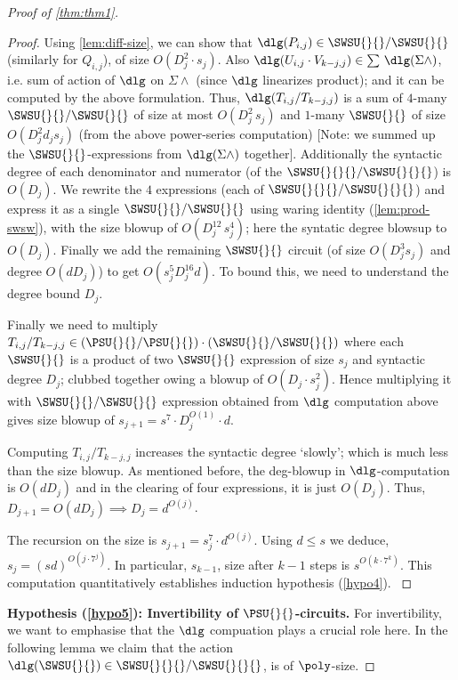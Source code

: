 \begin{proof}[Proof of \autoref{thm:thm1}]
\begin{proof}
Using \autoref{lem:diff-size}, we can show that $\dlg(P_{i,j}) \in \SWSU{}{}/\SWSU{}{}$ (similarly for $Q_{i,j}$), of size $O(D_{j}^2 \cdot s_j)$. Also $\dlg(U_{i,j} \cdot V_{k-j,j}) \in \sum \,\dlg(\Sigma \wedge)$, i.e. sum of action of $\dlg$ on $\Sigma \wedge$ (since $\dlg$ linearizes product); and it can be computed by the above formulation. 
Thus, $\dlg(T_{i,j}/T_{k-j,j})$ is a sum of $4$-many  $\SWSU{}{}/\SWSU{}{}$ of size at most $O(D_{j}^2\,s_j)$ and $1$-many $\SWSU{}{}$ of size $O(D_j^2 d_j s_j)$ (from the above power-series computation) [Note: we summed up the $\SWSU{}{}$-expressions from $\dlg(\Sigma \wedge)$ together]. Additionally the syntactic degree of each denominator and numerator (of the $\SWSU{}{}{}/\SWSU{}{}{}$) is $O(D_j)$. We rewrite the $4$ expressions (each of $\SWSU{}{}{}/\SWSU{}{}{}$) and express it as a single $\SWSU{}{}/\SWSU{}{}$ using waring identity (\autoref{lem:prod-swsw}), with the size blowup of $O(D_{j}^{12}\,s_j^{4})$; here the syntatic degree blowsup to $O(D_j)$. Finally we add the remaining $\SWSU{}{}$ circuit (of size $O(D_j^3 s_j)$ and degree $O(dD_j)$) to get $O(s_j^{5} D_{j}^{16}d)$. To bound this, we need to understand the degree bound $D_j$. 

Finally we need to multiply $T_{i,j}/T_{k-j,j} \in (\PSU{}{}/\PSU{}{}) \cdot (\SWSU{}{}/\SWSU{}{})$ where each $\SWSU{}{}$ is a product of two $\SWSU{}{}$ expression of size $s_j$ and syntactic degree $D_j$; clubbed together owing a blowup of $O(D_j \cdot s_j^2)$. Hence multiplying it with $\SWSU{}{} / \SWSU{}{}$ expression obtained from $\dlg$ computation above gives size blowup of $s_{j+1} = s^7 \cdot D_j^{O(1)} \cdot d$.

Computing $T_{i,j}/T_{k-j,j}$ increases the syntactic degree `slowly'; which is much less than the size blowup.
As mentioned before, the deg-blowup in $\dlg$-computation is $O(dD_j)$ and in the clearing of four expressions, it is just $O(D_j)$. Thus, $D_{j+1}= O(dD_j) \implies D_j= d^{O(j)}$. 
 
The recursion on the size is $s_{j+1} = s_j^{7} \cdot d^{O(j)}$. Using $d \le s$ we deduce, $s_j= (sd)^{O(j \cdot 7^j)}$. In particular, $s_{k-1}$, size after $k-1$ steps is $s^{O(k \cdot 7^k)}$. This computation quantitatively establishes induction hypothesis (\ref{hypo4}).
\label{deg-bound-thm1}
\end{proof}

\smallskip

\noindent \textbf{Hypothesis (\ref{hypo5}): Invertibility of $\PSU{}{}$-circuits.} For invertibility, we want to emphasise that the $\dlg$ compuation plays a crucial role here. In the following lemma we claim that the action $\dlg(\SWSU{}{}) \in \SWSU{}{}{}/\SWSU{}{}{}$, is of $\poly$-size. 


\end{proof}
